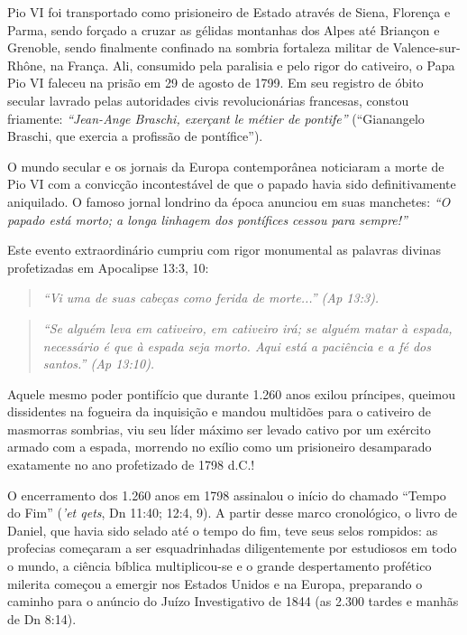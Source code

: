\documentclass[11pt,a4paper,openany]{book}
\begin{document}
Pio VI foi transportado como prisioneiro de Estado através de Siena, Florença e Parma, sendo forçado a cruzar as gélidas montanhas dos Alpes até Briançon e Grenoble, sendo finalmente confinado na sombria fortaleza militar de Valence-sur-Rhône, na França. Ali, consumido pela paralisia e pelo rigor do cativeiro, o Papa Pio VI faleceu na prisão em 29 de agosto de 1799. Em seu registro de óbito secular lavrado pelas autoridades civis revolucionárias francesas, constou friamente: \textit{``Jean-Ange Braschi, exerçant le métier de pontife''} (``Gianangelo Braschi, que exercia a profissão de pontífice'').

O mundo secular e os jornais da Europa contemporânea noticiaram a morte de Pio VI com a convicção incontestável de que o papado havia sido definitivamente aniquilado. O famoso jornal londrino da época anunciou em suas manchetes: \textit{``O papado está morto; a longa linhagem dos pontífices cessou para sempre!''}

Este evento extraordinário cumpriu com rigor monumental as palavras divinas profetizadas em Apocalipse 13:3, 10:

\begin{quote}
\itshape ``Vi uma de suas cabeças como ferida de morte...'' (Ap 13:3).
\end{quote}


\begin{quote}
\itshape ``Se alguém leva em cativeiro, em cativeiro irá; se alguém matar à espada, necessário é que à espada seja morto. Aqui está a paciência e a fé dos santos.'' (Ap 13:10).
\end{quote}


Aquele mesmo poder pontifício que durante 1.260 anos exilou príncipes, queimou dissidentes na fogueira da inquisição e mandou multidões para o cativeiro de masmorras sombrias, viu seu líder máximo ser levado cativo por um exército armado com a espada, morrendo no exílio como um prisioneiro desamparado exatamente no ano profetizado de 1798 d.C.!

O encerramento dos 1.260 anos em 1798 assinalou o início do chamado ``Tempo do Fim'' (\textit{'et qets}, Dn 11:40; 12:4, 9). A partir desse marco cronológico, o livro de Daniel, que havia sido selado até o tempo do fim, teve seus selos rompidos: as profecias começaram a ser esquadrinhadas diligentemente por estudiosos em todo o mundo, a ciência bíblica multiplicou-se e o grande despertamento profético milerita começou a emergir nos Estados Unidos e na Europa, preparando o caminho para o anúncio do Juízo Investigativo de 1844 (as 2.300 tardes e manhãs de Dn 8:14).
\end{document}
